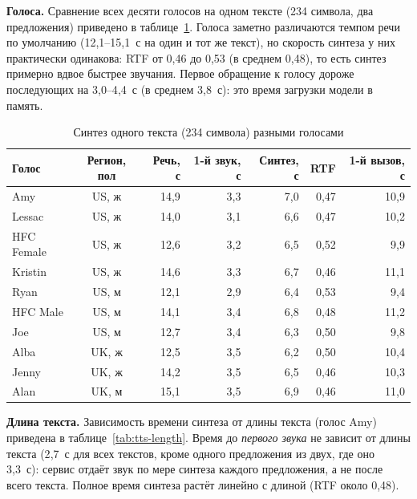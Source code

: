 \textbf{Голоса.} Сравнение всех десяти голосов на одном тексте
(234 символа, два предложения) приведено в
таблице~\ref{tab:tts-voices}. Голоса заметно различаются темпом
речи по умолчанию (12{,}1--15{,}1~с на один и тот же текст), но
скорость синтеза у них практически одинакова: RTF от 0{,}46 до 0{,}53
(в среднем 0{,}48), то есть синтез примерно вдвое быстрее звучания.
Первое обращение к голосу дороже последующих на 3{,}0--4{,}4~с (в
среднем 3{,}8~с): это время загрузки модели в память.

\begin{table}[H]
  \centering
  \caption{Синтез одного текста (234 символа) разными голосами}
  \label{tab:tts-voices}
  \small
  \begin{tabular}{|l|c|r|r|r|r|r|}
    \hline
    Голос & Регион, пол & Речь, с & 1-й звук, с & Синтез, с & RTF & 1-й вызов, с \\
    \hline
    Amy & US, ж & 14{,}9 & 3{,}3 & 7{,}0 & 0{,}47 & 10{,}9 \\
    \hline
    Lessac & US, ж & 14{,}0 & 3{,}1 & 6{,}6 & 0{,}47 & 10{,}2 \\
    \hline
    HFC Female & US, ж & 12{,}6 & 3{,}2 & 6{,}5 & 0{,}52 & 9{,}9 \\
    \hline
    Kristin & US, ж & 14{,}6 & 3{,}3 & 6{,}7 & 0{,}46 & 11{,}1 \\
    \hline
    Ryan & US, м & 12{,}1 & 2{,}9 & 6{,}4 & 0{,}53 & 9{,}4 \\
    \hline
    HFC Male & US, м & 14{,}1 & 3{,}4 & 6{,}8 & 0{,}48 & 11{,}2 \\
    \hline
    Joe & US, м & 12{,}7 & 3{,}4 & 6{,}3 & 0{,}50 & 9{,}8 \\
    \hline
    Alba & UK, ж & 12{,}5 & 3{,}5 & 6{,}2 & 0{,}50 & 10{,}4 \\
    \hline
    Jenny & UK, ж & 14{,}2 & 3{,}5 & 6{,}5 & 0{,}46 & 10{,}3 \\
    \hline
    Alan & UK, м & 15{,}1 & 3{,}5 & 6{,}9 & 0{,}46 & 11{,}0 \\
    \hline
  \end{tabular}
\end{table}

\textbf{Длина текста.} Зависимость времени синтеза от длины текста
(голос Amy) приведена в таблице~\ref{tab:tts-length}. Время до
\emph{первого звука} не зависит от длины текста (2{,}7~с для всех
текстов, кроме одного предложения из двух, где оно 3{,}3~с): сервис
отдаёт звук по мере синтеза каждого предложения, а не после всего
текста. Полное время синтеза растёт линейно с длиной (RTF около
0{,}48).

